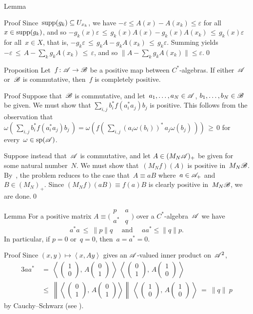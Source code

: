 \documentclass[a]{subfiles}
\begin{document}
\begin{parsec}
\begin{point}{Lemma}
\begin{point}{Proof}
Since~$\operatorname{supp}(g_k)\subseteq U_{x_k}$,
we have $-\varepsilon \leq A(x)-A(x_k)\leq \varepsilon$
for all~$x\in \operatorname{supp}(g_k)$,
and so  $-g_k(x) \varepsilon
\,\leq\, g_k(x) A(x) - g_k(x) A(x_k)\,\leq\, g_k(x) \varepsilon$
for all~$x\in X$,
that is,  $-g_k \varepsilon
\,\leq\, g_k A - g_k A(x_k)\,\leq\, g_k \varepsilon$.
Summing yields
$-\varepsilon \,\leq\, A- \sum_k g_k A(x_k)\,\leq\, \varepsilon$,
and so $\|A-\sum_k g_k A(x_k)\|\leq \varepsilon$.\qed
\end{point}
\end{point}
\begin{point}{Proposition}%
Let~$f\colon \mathscr{A}\to\mathscr{B}$ be a 
positive map between $C^*$-algebras.
If either~$\mathscr{A}$ or~$\mathscr{B}$ is commutative,
then~$f$ is completely positive.
\begin{point}{Proof}%
Suppose that~$\mathscr{B}$ is commutative,
and let~$a_1,\dotsc,a_N\in \mathscr{A}$,
$b_1,\dotsc,b_N\in\mathscr{B}$ be given.
We must
show that $\sum_{i,j} b_i^*f(a_i^*a_j)b_j$ is positive.
This follows from the observation that
$\omega(\,\sum_{i,j} b_i^*f(a_i^*a_j)b_j\,)
= \omega(f(\,\sum_{i,j}(a_i\omega(b_i))^*\,a_j \omega(b_j)\,))\,\geq \,0$
for every~$\omega\in\mathrm{sp}(\mathscr{A})$.
\begin{point}%
Suppose instead that~$\mathscr{A}$ is commutative,
and let $A\in (M_N\mathscr{A})_+$
be given for some natural number~$N$.
We must show that~$(M_Nf)(A)$ is positive in~$M_N\mathscr{B}$.
By~,
the problem reduces to the case that~$A\equiv a B$
where~$a\in \mathscr{A}_+$ and~$B\in (M_N)_+$.
Since $(M_Nf)(aB)\equiv f(a)B$ is clearly positive
in~$M_N\mathscr{B}$,
we are done.\qed
\end{point}
\end{point}
\end{point}
\begin{point}{Lemma}%
For a positive
matrix $A\equiv \bigl(\begin{smallmatrix} p & a \\ a^* & q
\end{smallmatrix}\bigr)$
over a $C^*$-algebra~$\mathscr{A}$
we have
\begin{equation*}
	a^*a\ \leq\  \|p\|q
	\quad\text{ and }\quad
	aa^*\leq \|q\|p.
\end{equation*}
In particular,
if $p=0$ or~$q=0$, then~$a=a^*=0$.
\begin{point}{Proof}%
Since $(x,y)\mapsto \left<x,Ay\right>$
gives an $\mathscr{A}$-valued inner product
on~$\mathscr{A}^2$,
{
\newcommand\twovect[2]{%
\left(\begin{smallmatrix}#1\\#2\end{smallmatrix}\right)}
\newcommand\onezero{\twovect{1}{0}}
\newcommand\zeroone{\twovect{0}{1}}
\begin{alignat*}{3}
	aa^*
	\ &=\  \left<\,\onezero,\,A\zeroone\,\right> \ 
\left<\,\zeroone,\,A\onezero\,\right> \\
\ &\leq\  
\left\|\left<\,\zeroone,\,A\zeroone\right>\right\| \ 
\left<\,\onezero,\,A\onezero\,\right>
\ =\  \|q\|\  p
\end{alignat*}
}
by Cauchy--Schwarz (see ).


\end{point}
\end{point}
\end{parsec}
\end{document}

